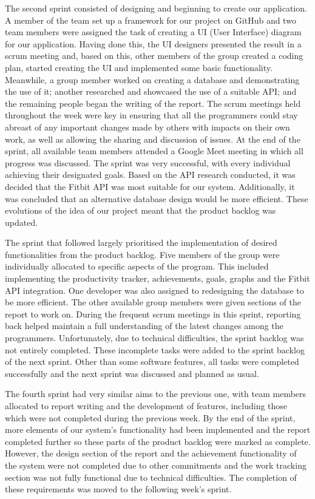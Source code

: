 \documentclass[12pt]{article}
\begin{document}
The second sprint consisted of designing and beginning to create our
application. A member of the team set up a framework for our project on GitHub
and two team members were assigned the task of creating a UI (User Interface)
diagram for our application. Having done this, the UI designers presented the
result in a scrum meeting and, based on this, other members of the group
created a coding plan, started creating the UI and implemented some basic
functionality. Meanwhile, a group member worked on creating a database and
demonstrating the use of it; another researched and showcased the use of a
suitable API; and the remaining people began the writing of the report. The
scrum meetings held throughout the week were key in ensuring that all the
programmers could stay abreast of any important changes made by others with
impacts on their own work, as well as allowing the sharing and discussion of
issues. At the end of the sprint, all available team members attended a Google
Meet meeting in which all progress was discussed. The sprint was very
successful, with every individual achieving their designated goals. Based on
the API research conducted, it was decided that the Fitbit API was most
suitable for our system. Additionally, it was concluded that an alternative
database design would be more efficient. These evolutions of the idea of our
project meant that the product backlog was updated.\par

The sprint that followed largely prioritised the implementation of desired
functionalities from the product backlog. Five members of the group were
individually allocated to specific aspects of the program. This included
implementing the productivity tracker, achievements, goals, graphs and the
Fitbit API integration. One developer was also assigned to redesigning the
database to be more efficient. The other available group members were given
sections of the report to work on. During the frequent scrum meetings in this
sprint, reporting back helped maintain a full understanding of the latest
changes among the programmers. Unfortunately, due to technical difficulties,
the sprint backlog was not entirely completed. These incomplete tasks were
added to the sprint backlog of the next sprint. Other than some software
features, all tasks were completed successfully and the next sprint was
discussed and planned as usual.\par

The fourth sprint had very similar aims to the previous one, with team members
allocated to report writing and the development of features, including those
which were not completed during the previous week. By the end of the sprint,
more elements of our system's functionality had been implemented and the report
completed further so these parts of the product backlog were marked as
complete. However, the design section of the report and the achievement
functionality of the system were not completed due to other commitments and the
work tracking section was not fully functional due to technical difficulties.
The completion of these requirements was moved to the following week's
sprint.\par
\end{document}
